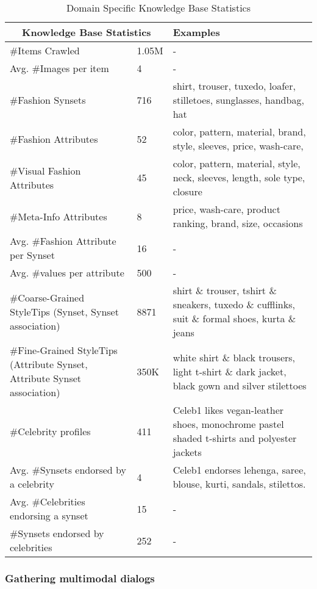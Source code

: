 \documentclass[letterpaper]{article} %
\begin{document}
\begin{table}
{\tiny
\begin{center}
\begin{tabular}{|p{3.1cm}|p{0.7cm}|p{3.3cm}|} \hline
\multicolumn{2}{|c|}{\textbf{Knowledge Base Statistics}} & \textbf{Examples} \\ \hline
\#Items Crawled & 1.05M & -\\\hline
Avg. \#Images per item & 4 & -\\\hline
\#Fashion Synsets& 716 & shirt, trouser, tuxedo, loafer, stilletoes, sunglasses, handbag, hat \\\hline
\#Fashion Attributes & 52 & color, pattern, material, brand, style, sleeves, price, wash-care, \\\hline
\#Visual Fashion Attributes & 45 & color, pattern, material, style, neck, sleeves, length, sole type, closure \\\hline
\#Meta-Info Attributes & 8 & price, wash-care, product ranking, brand, size, occasions \\\hline
Avg. \#Fashion Attribute per Synset & 16 & -\\\hline
Avg. \#values per attribute & 500 & - \\\hline
\#Coarse-Grained StyleTips (Synset, Synset association)& 8871 & shirt \& trouser, tshirt \& sneakers, tuxedo \& cufflinks, suit \& formal shoes, kurta \& jeans\\\hline
\#Fine-Grained StyleTips (Attribute Synset, Attribute Synset association) & 350K & white shirt \& black trousers, light t-shirt \& dark jacket, black gown and silver stilettoes \\ \hline
\#Celebrity profiles & 411 & Celeb1 likes vegan-leather shoes, monochrome pastel shaded t-shirts and polyester jackets \\ \hline
Avg. \#Synsets endorsed by a celebrity & 4 & Celeb1 endorses lehenga, saree, blouse, kurti, sandals, stilettos. \\ \hline
Avg. \#Celebrities endorsing a synset & 15 & - \\ \hline
\#Synsets endorsed by celebrities & 252 & -\\ \hline
\end{tabular}
\end{center}
}
\caption{Domain Specific Knowledge Base Statistics}
\label{tab:knowledge_stats}
\end{table}

\subsubsection{Gathering multimodal dialogs}
\end{document}
